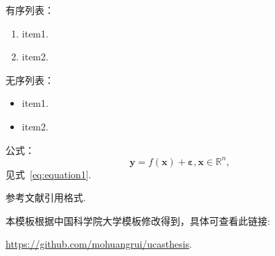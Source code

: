 {{有序列表：
\begin{enumerate}
    \item item1.
    \item item2.
\end{enumerate}

无序列表：
\begin{itemize}
    \item item1.
    \item item2.
\end{itemize}

公式：
\begin{equation}
    \boldsymbol{y} = f(\boldsymbol{x}) + \boldsymbol{\varepsilon}, \boldsymbol{x}\in\mathbb{R}^n, \label{eq:equation1}
\end{equation}
见式~\eqref{eq:equation1}.

参考文献引用格式\cite{journal, inproceedings, book}.

\vspace*{2cm}
{\colorbox[rgb]{0.9,0.6,0.2}{本模板根据中国科学院大学模板修改得到，具体可查看此链接:}}

{\colorbox[rgb]{0.9,0.6,0.2}{\href{https://github.com/mohuangrui/ucasthesis}{https://github.com/mohuangrui/ucasthesis}.}}


}
}
